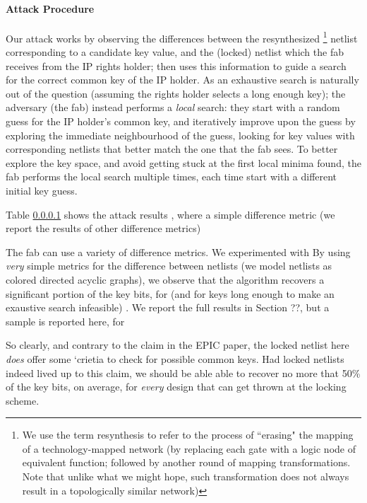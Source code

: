 \paragraph{Attack Procedure} Our attack works by observing the differences between the resynthesized \footnote{We use the term resynthesis to refer to the process of ``erasing" the mapping of a technology-mapped network (by replacing each gate with a logic node of equivalent function; followed by another round of mapping transformations. Note that unlike what we might hope, such transformation does not always result in a topologically similar network) } netlist corresponding to a candidate key value, and the (locked) netlist which the fab receives from the IP rights holder; then uses this information to guide a search for the correct common key of the IP holder. As an exhaustive search is naturally out of the question (assuming the rights holder selects a long enough key); the adversary (the fab) instead performs a \emph{local} search: they start with a random guess for the IP holder's common key, and iteratively improve upon the guess by exploring the immediate neighbourhood of the guess, looking for key values with corresponding netlists that better match the one that the fab sees. To better explore the key space, and avoid getting stuck at the first local minima found, the fab performs the local search multiple times, each time start with a different initial key guess. 

Table \ref{} shows the attack results , where a simple difference metric (we report the results of other difference metrics)


The fab can use a variety of difference metrics. We experimented with  By using \emph{very} simple metrics for the difference between netlists (we model netlists as colored directed acyclic graphs), we observe that the algorithm recovers a significant portion of the key bits, for (and for keys long enough to make an exaustive search infeasible) . We report the full results in Section ??, but a sample is reported here, for  


So clearly, and contrary to the claim in the EPIC paper, the locked netlist here \emph{does} offer some `crietia to check for possible common keys. Had locked netlists indeed lived up to this claim, we should be able able to recover no more that 50\% of the key bits, on average, for \emph{every} design that can get thrown at the locking scheme.

